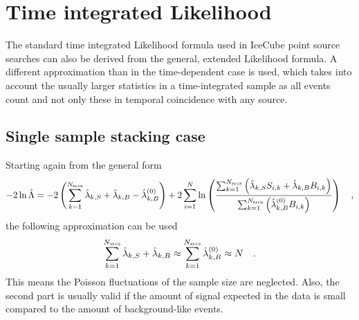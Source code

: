 \section{Time integrated Likelihood}
The standard time integrated Likelihood formula used in IceCube point source searches can also be derived from the general, extended Likelihood formula.
A different approximation than in the time-dependent case is used, which takes into account the usually larger statistics in a time-integrated sample as all events count and not only these in temporal coincidence with any source.

\subsection{Single sample stacking case}
Starting again from the general form
\begin{equation}
  -2\ln\hat{\Lambda}
  = -2\left(\sum_{k=1}^{N_\text{srcs}}\hat{\lambda}_{k,S} +
                                      \hat{\lambda}_{k,B} -
                                      \hat{\lambda}_{k,B}^{(0)}\right) +
    2\sum_{i=1}^N \ln\left(
      \frac{\sum_{k=1}^{N_\text{srcs}}\left(
          \hat{\lambda}_{k,S} S_{i,k}+\hat{\lambda}_{k,B} B_{i,k}\right)}
          {\sum_{k=1}^{N_\text{srcs}}\left(
            \hat{\lambda}_{k,B}^{(0)} B_{i,k}
          \right)}
        \right)
  \quad\text{,}
\end{equation}
the following approximation can be used
\begin{equation}
  \sum_{k=1}^{N_\text{srcs}} \hat{\lambda}_{k,S} + \hat{\lambda}_{k,B} \approx
    \sum_{k=1}^{N_\text{srcs}} \hat{\lambda}_{k,B}^{(0)} \approx N
  \quad\text{.}
\end{equation}
This means the Poisson fluctuations of the sample size are neglected.
Also, the second part is usually valid if the amount of signal expected in the data is small compared to the amount of background-like events.


